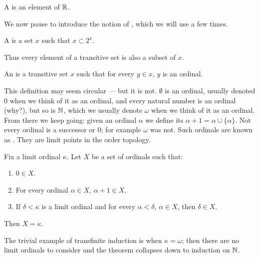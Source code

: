 \begin{definition}
A  is an element of $\mathbb{R}$.
\end{definition}

\begin{subsec}
We now pause to introduce the notion of , which we will use a few times.
\end{subsec}

\begin{definition}
A  is a set $x$ such that $x \subset 2^{x}$.
\end{definition}

\begin{subsec}
Thus every element of a transitive set is also a subset of $x$.
\end{subsec}

\begin{definition}\label{ordinal dfn}
An  is a transitive set $x$ such that for every $y \in x$, $y$ is an ordinal.
\end{definition}

\begin{subsec}
This definition may seem circular --- but it is not. $\emptyset$ is an ordinal, usually denoted $0$ when we think of it as an ordinal, and every natural number is an ordinal (why?), but so is $\mathbb{N}$, which we usually denote $\omega$ when we think of it as an ordinal.
From there we keep going: given an ordinal $\alpha$ we define its  $\alpha + 1 = \alpha \cup \{\alpha\}$.
Not every ordinal is a successor or $0$; for example $\omega$ was not. Such ordinals are known as .
They are limit points in the order topology.
\end{subsec}

\begin{theorem}\label{transfinite induction}
Fix a limit ordinal $\kappa$. Let $X$ be a set of ordinals such that:
\begin{enumerate}
\item $0 \in X$.
\item For every ordinal $\alpha \in X$, $\alpha + 1 \in X$.
\item If $\delta < \kappa$ is a limit ordinal and for every $\alpha < \delta$, $\alpha \in X$, then $\delta \in X$.
\end{enumerate}
Then $X = \kappa$.
\end{theorem}

\begin{subsec}
The trivial example of transfinite induction is when $\kappa = \omega$; then there are no limit ordinals to consider and the theorem collapses down to induction on $\mathbb{N}$.
\end{subsec}


